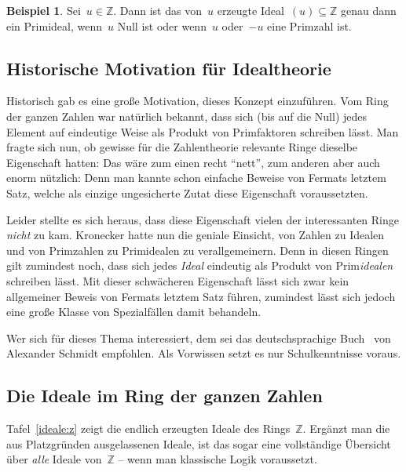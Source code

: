 \documentclass[a4paper,ngerman,12pt]{scrartcl}
\theoremstyle{definition}
\newtheorem{bsp}[defn]{Beispiel}
\theoremstyle{plain}
\theoremstyle{remark}
\newcommand{\ZZ}{\mathbb{Z}}
\renewcommand{\_}{\mathpunct{.}\,}
\newcommand{\?}{\,{:}\,}
\begin{document}
\begin{bsp}Sei~$u \in \ZZ$. Dann ist das von~$u$ erzeugte Ideal~$(u) \subseteq
\ZZ$ genau dann ein Primideal, wenn~$u$ Null ist oder wenn~$u$ oder~$-u$ eine
Primzahl ist.\end{bsp}


\subsection{Historische Motivation für Idealtheorie}

Historisch gab es eine große Motivation, dieses Konzept einzuführen. Vom Ring
der ganzen Zahlen war natürlich bekannt, dass sich (bis auf die Null) jedes
Element auf eindeutige Weise als Produkt von Primfaktoren schreiben lässt. Man
fragte sich nun, ob gewisse für die Zahlentheorie relevante Ringe dieselbe
Eigenschaft hatten: Das wäre zum einen recht "`nett"', zum anderen aber auch
enorm nützlich: Denn man kannte schon einfache Beweise von Fermats letztem
Satz, welche als einzige ungesicherte Zutat diese Eigenschaft voraussetzten.

Leider stellte es sich heraus, dass diese Eigenschaft vielen der interessanten
Ringe \emph{nicht} zu kam. Kronecker hatte nun die geniale Einsicht, von
Zahlen zu Idealen und von Primzahlen zu Primidealen zu verallgemeinern. Denn in
diesen Ringen gilt zumindest noch, dass sich jedes \emph{Ideal} eindeutig als
Produkt von Prim\emph{idealen} schreiben lässt. Mit dieser schwächeren Eigenschaft
lässt sich zwar kein allgemeiner Beweis von Fermats letztem Satz führen,
zumindest lässt sich jedoch eine große Klasse von Spezialfällen damit
behandeln.

Wer sich für dieses Thema interessiert, dem sei das deutschsprachige
Buch~\cite{schmidt:zahlentheorie} von Alexander Schmidt empfohlen. Als Vorwissen
setzt es nur Schulkenntnisse voraus.


\subsection{Die Ideale im Ring der ganzen Zahlen}

Tafel~\ref{ideale:z} zeigt die endlich erzeugten Ideale des Rings~$\ZZ$.
Ergänzt man die aus Platzgründen ausgelassenen Ideale, ist das
sogar eine vollständige Übersicht über \emph{alle} Ideale von~$\ZZ$ --
wenn man klassische Logik voraussetzt.
\end{document}
